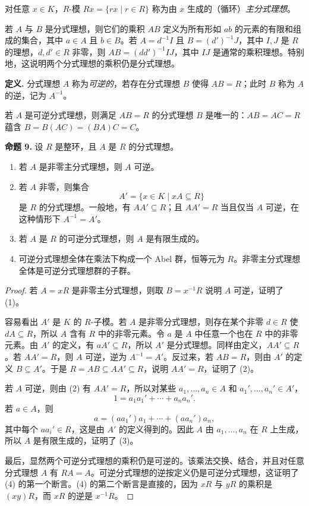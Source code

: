 对任意 $x\in K$，$R$-模 $Rx=\{rx\mid r\in R\}$ 称为由 $x$ 生成的（循环）\emph{主分式理想}。

若 $A$ 与 $B$ 是分式理想，则它们的乘积 $AB$ 定义为所有形如 $ab$ 的元素的有限和组成的集合，其中 $a\in A$ 且 $b\in B$。若 $A=d^{-1}I$ 且 $B=(d')^{-1}J$，其中 $I,J$ 是 $R$ 的理想，$d,d'\in R$ 非零，则 $AB=(dd')^{-1}IJ$，其中 $IJ$ 是通常的乘积理想。特别地，这说明两个分式理想的乘积仍是分式理想。

\noindent\textbf{定义.} 分式理想 $A$ 称为\emph{可逆的}，若存在分式理想 $B$ 使得 $AB=R$；此时 $B$ 称为 $A$ 的逆，记为 $A^{-1}$。

若 $A$ 是可逆分式理想，则满足 $AB=R$ 的分式理想 $B$ 是唯一的：$AB=AC=R$ 蕴含 $B=B(AC)=(BA)C=C$。

\medskip
\noindent\textbf{命题 9.} 设 $R$ 是整环，且 $A$ 是 $R$ 的分式理想。
\begin{enumerate}[label=(\arabic*)]
  \item 若 $A$ 是非零主分式理想，则 $A$ 可逆。
  \item 若 $A$ 非零，则集合
  \[
    A'=\{x\in K\mid xA\subseteq R\}
  \]
  是 $R$ 的分式理想。一般地，有 $AA'\subseteq R$；且 $AA'=R$ 当且仅当 $A$ 可逆，在这种情形下 $A^{-1}=A'$。
  \item 若 $A$ 是 $R$ 的可逆分式理想，则 $A$ 是有限生成的。
  \item 可逆分式理想全体在乘法下构成一个 Abel 群，恒等元为 $R$。非零主分式理想全体是可逆分式理想群的子群。
\end{enumerate}

\begin{proof}
若 $A=xR$ 是非零主分式理想，则取 $B=x^{-1}R$ 说明 $A$ 可逆，证明了 (1)。

容易看出 $A'$ 是 $K$ 的 $R$-子模。若 $A$ 是非零分式理想，则存在某个非零 $d\in R$ 使 $dA\subseteq R$，所以 $A$ 含有 $R$ 中的非零元素。令 $a$ 是 $A$ 中任意一个也在 $R$ 中的非零元素。由 $A'$ 的定义，有 $aA'\subseteq R$，所以 $A'$ 是分式理想。同样由定义，$AA'\subseteq R$。若 $AA'=R$，则 $A$ 可逆，逆为 $A^{-1}=A'$。反过来，若 $AB=R$，则由 $A'$ 的定义 $B\subseteq A'$。于是 $R=AB\subseteq AA'\subseteq R$，说明 $AA'=R$，证明了 (2)。

若 $A$ 可逆，则由 (2) 有 $AA'=R$，所以对某些 $a_1,
\ldots,a_n\in A$ 和 $a_1',
\ldots,a_n'\in A'$，
\[
  1=a_1a_1'+\cdots+a_na_n'.
\]
若 $a\in A$，则
\[
  a=(aa_1')a_1+\cdots+(aa_n')a_n,
\]
其中每个 $aa_i'\in R$，这是由 $A'$ 的定义得到的。因此 $A$ 由 $a_1,
\ldots,a_n$ 在 $R$ 上生成，所以 $A$ 是有限生成的，证明了 (3)。

最后，显然两个可逆分式理想的乘积仍是可逆的。该乘法交换、结合，并且对任意分式理想 $A$ 有 $RA=A$。可逆分式理想的逆按定义仍是可逆分式理想，这证明了 (4) 的第一个断言。(4) 的第二个断言是直接的，因为 $xR$ 与 $yR$ 的乘积是 $(xy)R$，而 $xR$ 的逆是 $x^{-1}R$。
\end{proof}

